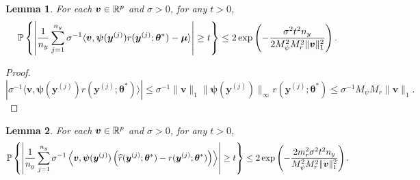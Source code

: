 \documentclass[11pt]{article}
\numberwithin{equation}{section}
\numberwithin{theorem}{section}
\def\fatv{\boldsymbol{v}}
\def\faty{\boldsymbol{y}}
\def\fatmu{\boldsymbol{\mu}}
\def\fattheta{\boldsymbol{\theta}}
\def\fatpsi{\boldsymbol{\psi}}
\newtheorem{lem}{Lemma}[section]
\theoremstyle{definition}
\theoremstyle{remark}
\begin{document}
\begin{lem} \label{lem:Hoeffding_dot_psi_r}
For each $\fatv \in \RR^p$ and $\sigma > 0$, for any $t > 0$,
\begin{equation}
\PP\left\{ \left| \frac{1}{n_y} \sum_{j=1}^{n_y} \sigma^{-1} \langle \fatv, \fatpsi(\faty^{(j)}) r(\faty^{(j)};\fattheta^*) - \fatmu \rangle \right| \geq t \right\}
\leq 2\exp\left( -\frac{\sigma^2 t^2 n_y}{2 M_\psi^2 M_r^2 \|\fatv\|_1^2} \right).
\end{equation}
\end{lem}

\begin{proof}
\begin{equation}
\left| \sigma^{-1} \langle \fatv, \fatpsi(\faty^{(j)}) r(\faty^{(j)};\fattheta^*) \rangle \right|
\leq \sigma^{-1} \|\fatv\|_1 \|\fatpsi(\faty^{(j)})\|_\infty r(\faty^{(j)};\fattheta^*)
\leq \sigma^{-1} M_\psi M_r \|\fatv\|_1.
\end{equation}
\end{proof}

\begin{lem} \label{lem:Hoeffding_dot_psi_rhat_minus_r}
For each $\fatv \in \RR^p$ and $\sigma > 0$, for any $t > 0$,
\begin{equation}
\PP\left\{ \left| \frac{1}{n_y} \sum_{j=1}^{n_y} \sigma^{-1} \left\langle \fatv, \fatpsi(\faty^{(j)}) \left( \hat r(\faty^{(j)};\fattheta^*) - r(\faty^{(j)};\fattheta^*) \right) \right\rangle \right| \geq t \right\}
\leq 2\exp\left( -\frac{2 m_r^2 \sigma^2 t^2 n_y}{M_\psi^2 M_r^2 \|\fatv\|_1^2} \right).
\end{equation}
\end{lem}
\end{document}
